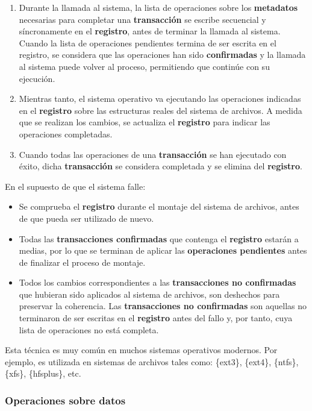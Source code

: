 \begin{enumerate}
\def\labelenumi{\arabic{enumi}.}
\item
  Durante la llamada al sistema, la lista de operaciones sobre los
  \textbf{metadatos} necesarias para completar una \textbf{transacción}
  se escribe secuencial y síncronamente en el \textbf{registro}, antes
  de terminar la llamada al sistema. Cuando la lista de operaciones
  pendientes termina de ser escrita en el registro, se considera que las
  operaciones han sido \textbf{confirmadas} y la llamada al sistema
  puede volver al proceso, permitiendo que continúe con su ejecución.
\item
  Mientras tanto, el sistema operativo va ejecutando las operaciones
  indicadas en el \textbf{registro} sobre las estructuras reales del
  sistema de archivos. A medida que se realizan los cambios, se
  actualiza el \textbf{registro} para indicar las operaciones
  completadas.
\item
  Cuando todas las operaciones de una \textbf{transacción} se han
  ejecutado con éxito, dicha \textbf{transacción} se considera
  completada y se elimina del \textbf{registro}.
\end{enumerate}

En el supuesto de que el sistema falle:

\begin{itemize}
\item
  Se comprueba el \textbf{registro} durante el montaje del sistema de
  archivos, antes de que pueda ser utilizado de nuevo.
\item
  Todas las \textbf{transacciones confirmadas} que contenga el
  \textbf{registro} estarán a medias, por lo que se terminan de aplicar
  las \textbf{operaciones pendientes} antes de finalizar el proceso de
  montaje.
\item
  Todos los cambios correspondientes a las \textbf{transacciones no
  confirmadas} que hubieran sido aplicados al sistema de archivos, son
  deshechos para preservar la coherencia. Las \textbf{transacciones no
  confirmadas} son aquellas no terminaron de ser escritas en el
  \textbf{registro} antes del fallo y, por tanto, cuya lista de
  operaciones no está completa.
\end{itemize}

Esta técnica es muy común en muchos sistemas operativos modernos. Por
ejemplo, es utilizada en sistemas de archivos tales como: \{ext3\},
\{ext4\}, \{ntfs\}, \{xfs\}, \{hfsplus\}, etc.

\subsubsection{Operaciones sobre datos}\label{_operaciones_sobre_datos}

